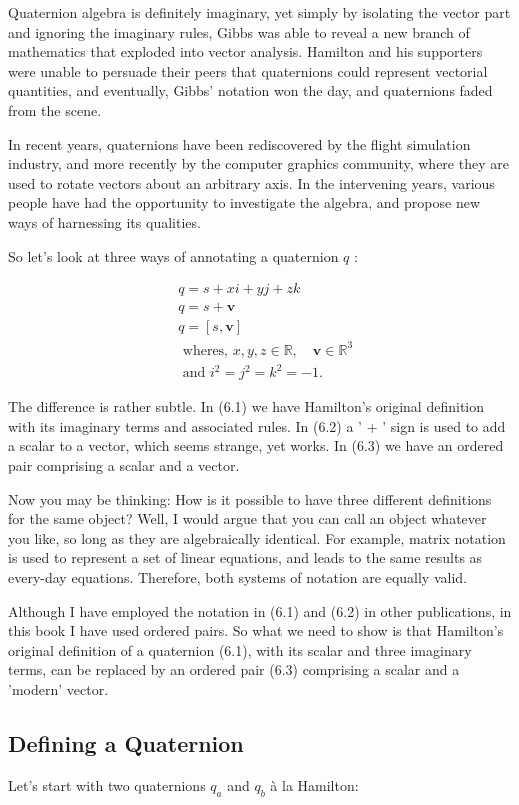 \documentclass[10pt]{article}
\begin{document}
Quaternion algebra is definitely imaginary, yet simply by isolating the vector part and ignoring the imaginary rules, Gibbs was able to reveal a new branch of mathematics that exploded into vector analysis. Hamilton and his supporters were unable to persuade their peers that quaternions could represent vectorial quantities, and eventually, Gibbs' notation won the day, and quaternions faded from the scene.

In recent years, quaternions have been rediscovered by the flight simulation industry, and more recently by the computer graphics community, where they are used to rotate vectors about an arbitrary axis. In the intervening years, various people have had the opportunity to investigate the algebra, and propose new ways of harnessing its qualities.

So let's look at three ways of annotating a quaternion $q$ :

$$
\begin{aligned}
& q=s+x i+y j+z k \\
& q=s+\mathbf{v} \\
& q=[s, \mathbf{v}] \\
& \text { wheres, } x, y, z \in \mathbb{R}, \quad \mathbf{v} \in \mathbb{R}^{3} \\
& \text { and } i^{2}=j^{2}=k^{2}=-1 .
\end{aligned}
$$

The difference is rather subtle. In (6.1) we have Hamilton's original definition with its imaginary terms and associated rules. In (6.2) a ' + ' sign is used to add a scalar to a vector, which seems strange, yet works. In (6.3) we have an ordered pair comprising a scalar and a vector.

Now you may be thinking: How is it possible to have three different definitions for the same object? Well, I would argue that you can call an object whatever you like, so long as they are algebraically identical. For example, matrix notation is used to represent a set of linear equations, and leads to the same results as every-day equations. Therefore, both systems of notation are equally valid.

Although I have employed the notation in (6.1) and (6.2) in other publications, in this book I have used ordered pairs. So what we need to show is that Hamilton's original definition of a quaternion (6.1), with its scalar and three imaginary terms, can be replaced by an ordered pair (6.3) comprising a scalar and a 'modern' vector.

\subsection{Defining a Quaternion}
Let's start with two quaternions $q_{a}$ and $q_{b}$ à la Hamilton:
\end{document}
